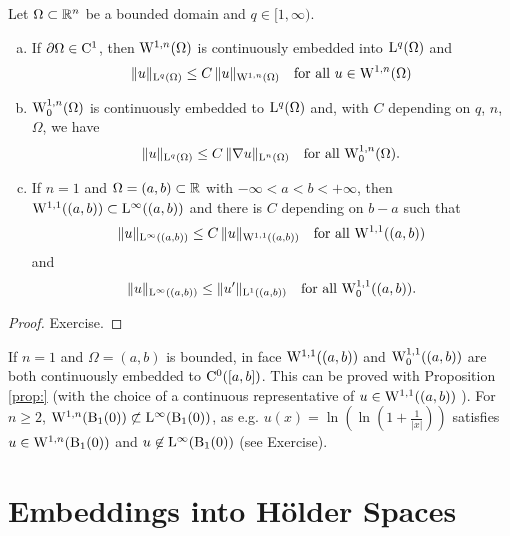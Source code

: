 \begin{prop}
  Let $\Omega \subset \mathbb{R}^n$ be a bounded domain and $q \in [1,\infty)$.
    \begin{enumerate}[a)]
      \item If $\partial\Omega \in \mathrm{C}^1$, then $\mathrm{W}^{1,n}(\Omega)$ is continuously embedded into $\mathrm{L}^q(\Omega)$ and 
        $$
        \|u\|_{\mathrm{L}^q(\Omega)} \leq C \, \|u\|_{\mathrm{W}^{1,n}(\Omega)} \quad\text{for all } u \in \mathrm{W}^{1,n}(\Omega)
        $$

      \item $\mathrm{W}_0^{1,n}(\Omega)$ is continuously embedded to $\mathrm{L}^q(\Omega)$ and, with $C$ depending on $q$, $n$, $\Omega$, we have
        $$
        \| u\|_{\mathrm{L}^q(\Omega)} \leq C \, \|\nabla u\|_{\mathrm{L}^n(\Omega)} \quad\text{for all } \mathrm{W}_0^{1,n}(\Omega).
        $$

      \item If $n = 1$ and $\Omega = (a,b) \subset \mathbb{R}$ with $-\infty < a < b < + \infty$, then $\mathrm{W}^{1,1}((a,b)) \subset \mathrm{L}^\infty((a,b))$ and there is $C$ depending on $b - a$ such that
        $$
        \|u\|_{\mathrm{L}^\infty((a,b))} \leq C \, \|u\|_{\mathrm{W}^{1,1}((a,b))} \quad\text{for all } \mathrm{W}^{1,1}((a,b))
        $$
        and
        $$
        \|u\|_{\mathrm{L}^\infty((a,b))} \leq \|u'\|_{\mathrm{L}^1((a,b))} \quad\text{for all } \mathrm{W}_0^{1,1}((a,b)).
        $$
    \end{enumerate}
\end{prop}

\begin{proof}
  Exercise.
\end{proof}

\begin{rem}
  If $n = 1$ and $\Omega = (a,b)$ is bounded, in face $\mathrm{W}^{1,1}((a,b))$ and $\mathrm{W}_0^{1,1}((a,b))$ are both continuously embedded to $\mathrm{C}^0([a,b])$.
  This can be proved with Proposition \ref{prop:} (with the choice of a continuous representative of $u \in \mathrm{W}^{1,1}((a,b))$ ).
  For $n \geq 2$, $\mathrm{W}^{1,n}(\mathrm{B}_1(0)) \not\subset \mathrm{L}^\infty(\mathrm{B}_1(0))$, as e.g. $u(x) = \ln(\ln(1 + \frac{1}{|x|}))$ satisfies $u \in \mathrm{W}^{1,n}(\mathrm{B}_1(0))$ and $u \not\in \mathrm{L}^\infty(\mathrm{B}_1(0))$ (see Exercise).
\end{rem}

\section{Embeddings into Hölder Spaces}

\setcounter{equation}{11}

